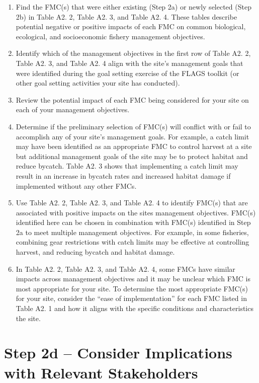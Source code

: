 \documentclass[]{book}
\begin{document}
\begin{enumerate}
\def\labelenumi{\arabic{enumi}.}
\item
  Find the FMC(s) that were either existing (Step 2a) or newly selected
  (Step 2b) in Table A2. 2, Table A2. 3, and Table A2. 4. These tables
  describe potential negative or positive impacts of each FMC on common
  biological, ecological, and socioeconomic fishery management
  objectives.
\item
  Identify which of the management objectives in the first row of Table
  A2. 2, Table A2. 3, and Table A2. 4 align with the site's management
  goals that were identified during the goal setting exercise of the
  FLAGS toolkit (or other goal setting activities your site has
  conducted).
\item
  Review the potential impact of each FMC being considered for your site
  on each of your management objectives.
\item
  Determine if the preliminary selection of FMC(s) will conflict with or
  fail to accomplish any of your site's management goals. For example, a
  catch limit may have been identified as an appropriate FMC to control
  harvest at a site but additional management goals of the site may be
  to protect habitat and reduce bycatch. Table A2. 3 shows that
  implementing a catch limit may result in an increase in bycatch rates
  and increased habitat damage if implemented without any other FMCs.
\item
  Use Table A2. 2, Table A2. 3, and Table A2. 4 to identify FMC(s) that
  are associated with positive impacts on the sites management
  objectives. FMC(s) identified here can be chosen in combination with
  FMC(s) identified in Step 2a to meet multiple management objectives.
  For example, in some fisheries, combining gear restrictions with catch
  limits may be effective at controlling harvest, and reducing bycatch
  and habitat damage.
\item
  In Table A2. 2, Table A2. 3, and Table A2. 4, some FMCs have similar
  impacts across management objectives and it may be unclear which FMC
  is most appropriate for your site. To determine the most appropriate
  FMC(s) for your site, consider the ``ease of implementation'' for each
  FMC listed in Table A2. 1 and how it aligns with the specific
  conditions and characteristics the site.
\end{enumerate}

\section{Step 2d -- Consider Implications with Relevant
Stakeholders}\label{step-2d-consider-implications-with-relevant-stakeholders}
\end{document}
